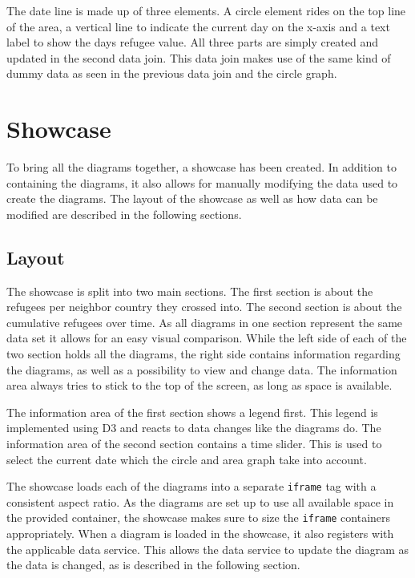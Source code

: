 The date line is made up of three elements. A circle element rides on the top line of the area, a vertical line to indicate the current day on the x-axis and a text label to show the days refugee value. All three parts are simply created and updated in the second data join. This data join makes use of the same kind of dummy data as seen in the previous data join and the circle graph.


\section{Showcase} \label{sec:showcase}
To bring all the diagrams together, a showcase has been created. In addition to containing the diagrams, it also allows for manually modifying the data used to create the diagrams. The layout of the showcase as well as how data can be modified are described in the following sections.

\subsection{Layout}
The showcase is split into two main sections. The first section is about the refugees per neighbor country they crossed into. The second section is about the cumulative refugees over time. As all diagrams in one section represent the same data set it allows for an easy visual comparison. While the left side of each of the two section holds all the diagrams, the right side contains information regarding the diagrams, as well as a possibility to view and change data. The information area always tries to stick to the top of the screen, as long as space is available.

The information area of the first section shows a legend first. This legend is implemented using D3 and reacts to data changes like the diagrams do. The information area of the second section contains a time slider. This is used to select the current date which the circle and area graph take into account. 

The showcase loads each of the diagrams into a separate \texttt{iframe} tag with a consistent aspect ratio. As the diagrams are set up to use all available space in the provided container, the showcase makes sure to size the \texttt{iframe} containers appropriately. When a diagram is loaded in the showcase, it also registers with the applicable data service. This allows the data service to update the diagram as the data is changed, as is described in the following section.

